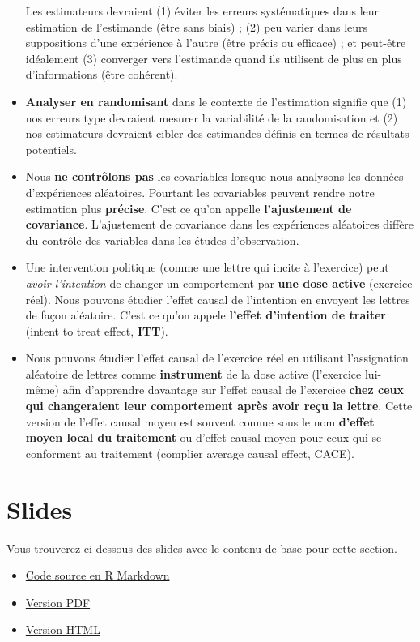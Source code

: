 \documentclass[
  12pt,
]{book}
\begin{document}
\begin{itemize}
  Les estimateurs devraient (1) éviter les erreurs systématiques dans leur estimation de l'estimande (être sans biais) ; (2) peu varier dans leurs suppositions d'une expérience à l'autre (être précis ou efficace) ; et peut-être idéalement (3) converger vers l'estimande quand ils utilisent de plus en plus d'informations (être cohérent).
\item
  \textbf{Analyser en randomisant} dans le contexte de l'estimation signifie que (1) nos erreurs type devraient mesurer la variabilité de la randomisation et (2) nos estimateurs devraient cibler des estimandes définis en termes de résultats potentiels.
\item
  Nous \textbf{ne contrôlons pas} les covariables lorsque nous analysons les données d'expériences aléatoires. Pourtant les covariables peuvent rendre notre estimation plus \textbf{précise}. C'est ce qu'on appelle \textbf{l'ajustement de covariance}. L'ajustement de covariance dans les expériences aléatoires diffère du contrôle des variables dans les études d'observation.
\item
  Une intervention politique (comme une lettre qui incite à l'exercice) peut \emph{avoir l'intention} de changer un comportement par \textbf{une dose active} (exercice réel). Nous pouvons étudier l'effet causal de l'intention en envoyent les lettres de façon aléatoire. C'est ce qu'on appele \textbf{l'effet d'intention de traiter} (intent to treat effect, \textbf{ITT}).
\item
  Nous pouvons étudier l'effet causal de l'exercice réel en utilisant l'assignation aléatoire de lettres comme \textbf{instrument} de la dose active (l'exercice lui-même) afin d'apprendre davantage sur l'effet causal de l'exercice \textbf{chez ceux qui changeraient leur comportement après avoir reçu la lettre}. Cette version de l'effet causal moyen est souvent connue sous le nom \textbf{d'effet moyen local du traitement} ou d'effet causal moyen pour ceux qui se conforment au traitement (complier average causal effect, CACE).
\end{itemize}

\hypertarget{slides-4}{%
\section{Slides}\label{slides-4}}

Vous trouverez ci-dessous des slides avec le contenu de base pour cette section.

\begin{itemize}
\item
  \href{https://egap.github.io/learningdays-resources/Slides/estimation-slides.Rmd}{Code source en R Markdown}
\item
  \href{https://egap.github.io/learningdays-resources/Slides/estimation-slides.pdf}{Version PDF}
\item
  \href{https://egap.github.io/learningdays-resources/Slides/estimation-slides.html}{Version HTML}
\end{itemize}
\end{document}
